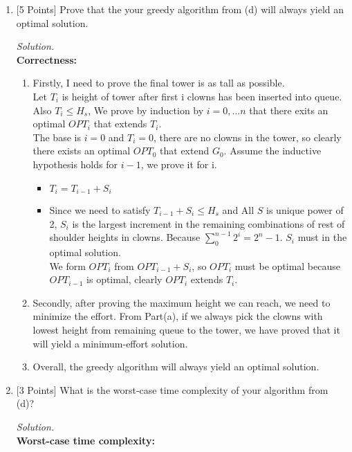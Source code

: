 \documentclass[10pt]{article}
\begin{document}
\begin{enumerate}[label=(\alph*)]
\begin{mdframed}
    \end{mdframed}
    \item {[5 Points]} Prove that the your greedy algorithm from (d) will always yield an optimal solution.
    \begin{mdframed}
        \textit{Solution.}\\
        \textbf{Correctness:}
        \begin{enumerate}
            \item Firstly, I need to prove the final tower is as tall as possible.\\ Let $T_i$ is height of tower after first i clowns has been inserted into queue. Also $T_i \leq H_s$, We prove by induction by $i= 0,...n$ that there exits an optimal $OPT_i$ that extends $T_i$.\\
            The base is $i=0$ and $T_i=0$, there are no clowns in the tower, so clearly there exists an optimal $OPT_0$ that extend $G_0$. Assume the inductive hypothesis holds for $i-1$, we prove it for i.
            \begin{itemize}
                \item $T_i = T_{i-1} + S_i$
                \item Since we need to satisfy $T_{i-1} + S_i \leq H_s$ and All $S$ is unique power of 2, $S_i$ is the largest increment in the remaining combinations of rest of shoulder heights in clowns. Because $\sum_{0}^{n-1} 2^i= 2^n -1$. $S_i$ must in the optimal solution.\\
                We form $OPT_{i}$ from $OPT_{i-1} + S_i$, so $OPT_i$ must be optimal because $OPT_{i-1}$ is optimal, clearly $OPT_i$ extends $T_i$.
            \end{itemize}
            \item Secondly, after proving the maximum height we can reach, we need to minimize the effort. From Part(a), if we always pick the clowns with lowest height from remaining queue to the tower, we have proved that it will yield a minimum-effort solution.
            \item Overall, the greedy algorithm will always yield an optimal solution.
        \end{enumerate}
    \end{mdframed}
    \item {[3 Points]} What is the worst-case time complexity of your algorithm from (d)?
    \begin{mdframed}
        \textit{Solution.}\\
        \textbf{Worst-case time complexity:}\\

\end{mdframed}
\end{enumerate}
\end{document}

